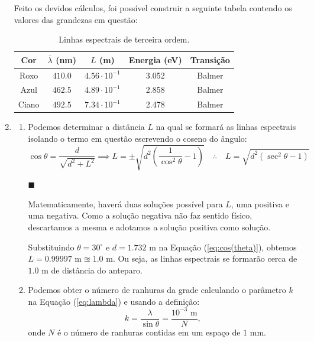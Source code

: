\documentclass[12pt,a4paper]{article}
\begin{document}
\begin{enumerate}
    Feito os devidos cálculos, foi possível construir a seguinte tabela contendo os valores das grandezas em questão:
    \begin{table}[htb!]
        \centering
        \caption{Linhas espectrais de terceira ordem.}
        \begin{tabular}{|c|c|c|c|c|}
            \hline
            Cor & $\overline{\lambda}$ (nm) & $L$ (m) & Energia (eV) & Transição \\
            \hline
            Roxo & $410.0$ & $4.56\cdot10^{-1}$ & 3.052 & Balmer \\
            Azul & $462.5$ & $4.89\cdot10^{-1}$ & 2.858 & Balmer \\
            Ciano & $492.5$ & $7.34\cdot10^{-1}$ & 2.478 & Balmer \\
            \hline
        \end{tabular}
        \label{tab:Atividade4-3}
    \end{table}
    



    \item 
    \begin{enumerate}
        \item Podemos determinar a distância $L$ na qual se formará as linhas espectrais isolando o termo em questão escrevendo o coseno do ângulo:
        \begin{equation} \label{eq:cos(theta)}
            \cos{\theta}=\frac{d}{\sqrt{d^2+L^2}}\implies L=\pm\sqrt{d^{2}\left(\frac{1}{\cos^{2}{\theta}}-1\right)}\quad\therefore\quad\boxed{L=\sqrt{d^{2}\left(\sec^{2}{\theta}-1\right)}}
        \end{equation}
        \begin{flushright}
            $\blacksquare$
        \end{flushright}
    
        Matematicamente, haverá duas soluções possível para $L$, uma positiva e uma negativa. Como a solução negativa não faz sentido físico, descartamos a mesma e adotamos a solução positiva como solução.
    
        Substituindo $\theta=30^{\circ}$ e $d=1.732\text{ m}$ na Equação (\ref{eq:cos(theta)}), obtemos $L=0.99997\text{ m}\approxeq1.0\text{ m}$. Ou seja, as linhas espectrais se formarão cerca de $1.0\text{ m}$ de distância do anteparo. 



        \item Podemos obter o número de ranhuras da grade calculando o parâmetro $k$ na Equação (\ref{eq:lambda}) e usando a definição:
        \begin{equation} \label{eq:Def_k}
            k=\frac{\lambda}{\sin{\theta}}=\frac{10^{-3}\text{ m}}{N},
        \end{equation}
        onde $N$ é o número de ranhuras contidas em um espaço de $1\text{ mm}$.


\end{enumerate}
\end{enumerate}
\end{document}
